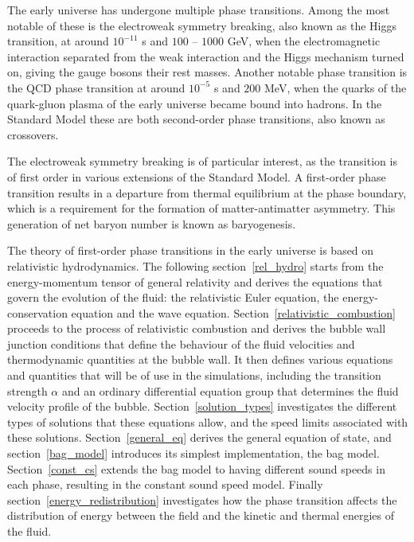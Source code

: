 The early universe has undergone multiple phase transitions.
Among the most notable of these is the electroweak symmetry breaking, also known as the Higgs transition, at around $10^{-11}$ s and $100$ -- $1000$ GeV,
when the electromagnetic interaction separated from the weak interaction and the Higgs mechanism turned on,
giving the gauge bosons their rest masses.
Another notable phase transition is the QCD phase transition at around $10^{-5}$ s and $200$ MeV,
when the quarks of the quark-gluon plasma of the early universe became bound into hadrons.
In the Standard Model these are both second-order phase transitions, also known as crossovers.
\cites{lecture_notes}{aoki_order_2006}

The electroweak symmetry breaking is of particular interest,
as the transition is of first order in various extensions of the Standard Model.
A first-order phase transition results in a departure from thermal equilibrium at the phase boundary,
which is a requirement for the formation of matter-antimatter asymmetry.
This generation of net baryon number is known as baryogenesis.
\cite{lecture_notes}

The theory of first-order phase transitions in the early universe is based on relativistic hydrodynamics.
The following section~\ref{rel_hydro} starts from the energy-momentum tensor of general relativity and derives the equations that
govern the evolution of the fluid: the relativistic Euler equation, the energy-conservation equation and the wave equation.
Section~\ref{relativistic_combustion} proceeds to the process of relativistic combustion and derives the bubble wall junction conditions
that define the behaviour of the fluid velocities and thermodynamic quantities at the bubble wall.
It then defines various equations and quantities that will be of use in the simulations,
including the transition strength $\alpha$ and an ordinary differential equation group that determines the fluid velocity profile of the bubble.
Section~\ref{solution_types} investigates the different types of solutions that these equations allow,
and the speed limits associated with these solutions.
Section~\ref{general_eq} derives the general equation of state,
and section~\ref{bag_model} introduces its simplest implementation, the bag model.
Section~\ref{const_cs} extends the bag model to having different sound speeds in each phase,
resulting in the constant sound speed model.
Finally section~\ref{energy_redistribution} investigates how the phase transition affects the distribution of energy between the field and the kinetic and thermal energies of the fluid.


